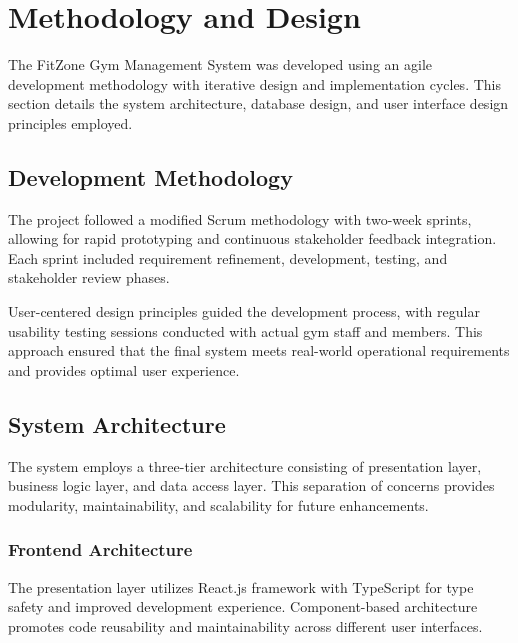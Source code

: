 \documentclass[12pt,a4paper]{report}
\begin{document}

\section{Methodology and Design}
\label{sec:methodology-design}

The FitZone Gym Management System was developed using an agile development methodology with iterative design and implementation cycles. This section details the system architecture, database design, and user interface design principles employed.

\subsection{Development Methodology}

The project followed a modified Scrum methodology with two-week sprints, allowing for rapid prototyping and continuous stakeholder feedback integration. Each sprint included requirement refinement, development, testing, and stakeholder review phases.

User-centered design principles guided the development process, with regular usability testing sessions conducted with actual gym staff and members. This approach ensured that the final system meets real-world operational requirements and provides optimal user experience.

\subsection{System Architecture}

The system employs a three-tier architecture consisting of presentation layer, business logic layer, and data access layer. This separation of concerns provides modularity, maintainability, and scalability for future enhancements.

\subsubsection{Frontend Architecture}

The presentation layer utilizes React.js framework with TypeScript for type safety and improved development experience. Component-based architecture promotes code reusability and maintainability across different user interfaces.
\end{document}
